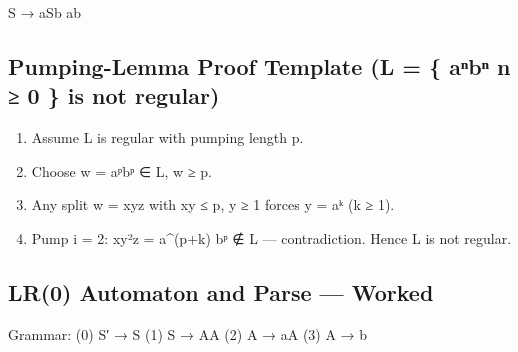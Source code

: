 S → aSb \textbar{} ab



\needspace{95pt}

\hypertarget{p2-08--154-pumping-lemma-proof-template-l---aux207fbux207f--n--0--is-not-regular}{%
\subsection{Pumping-Lemma Proof Template (L = \{ aⁿbⁿ \textbar{} n ≥ 0 \} is not regular)}\label{p2-08--154-pumping-lemma-proof-template-l---aux207fbux207f--n--0--is-not-regular}}

\begin{enumerate}
\def\labelenumi{\arabic{enumi}.}
\tightlist
\item
  Assume L is regular with pumping length p.
\item
  Choose w = aᵖbᵖ ∈ L, \textbar w\textbar{} ≥ p.
\item
  Any split w = xyz with \textbar xy\textbar{} ≤ p, \textbar y\textbar{} ≥ 1 forces y = aᵏ (k ≥ 1).
\item
  Pump i = 2: xy²z = a\^{}(p+k) bᵖ ∉ L --- contradiction. Hence L is not regular.
\end{enumerate}

\needspace{125pt}

\hypertarget{p2-08--155-lr0-automaton-and-parse--worked}{%
\subsection{LR(0) Automaton and Parse --- Worked}\label{p2-08--155-lr0-automaton-and-parse--worked}}

Grammar: (0) S′ → S (1) S → AA (2) A → aA (3) A → b



\begingroup\small

